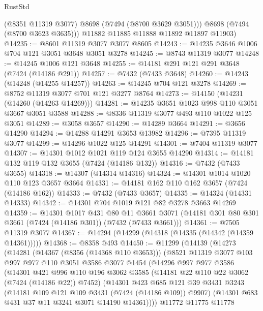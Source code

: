 \begin{lexlean}{RustStd}
\begin{coremodule}
          (@8351 @11319 @3077)
          @8698
          (@7494 (@8700 @3629 @3051)))
        @8698
        (@7494 (@8700 @3623 @3635)))
      @11882
      @11885
      @11888
      @11892
      @11897
      @11903)
@14235 := @8601 @11319 @3077 @3077 @8605
@14243 := @14235 @3646 @1006 @704 @121 @3051 @3648 @3051 @3278
@14245 := @8743 @11319 @3077
@14248 := @14245 @1006 @121 @3648
@14255 := @14181 @291 @121 @291 @3648 (@7424 (@14186 @291))
@14257 := @7432 (@7433 @3648)
@14260 := @14243 (@14248 (@14255 @14257))
@14263 := @14245 @704 @121 @3278
@14269 := @8752 @11319 @3077 @701 @121 @3277 @8764
@14273 := @14150 (@14231 (@14260 (@14263 @14269)))
@14281 := @14235 @3651 @1023 @998 @110 @3051 @3667 @3051 @3588
@14288 := @8336 @11319 @3077 @493 @110 @1022 @125 @3051
@14289 := @3058 @3657
@14290 := @14289 @3664
@14291 := @3656 @14290
@14294 := @14288 @14291 @3653 @13982
@14296 := @7395 @11319 @3077
@14299 := @14296 @1022 @125 @14291
@14301 := @7404 @11319 @3077
@14307 := @14301 @1012 @1021 @119 @124 @3655 @14290
@14314 := @14181 @132 @119 @132 @3655 (@7424 (@14186 @132))
@14316 := @7432 (@7433 @3655)
@14318 := @14307 (@14314 @14316)
@14324 := @14301 @1014 @1020 @110 @123 @3657 @3664
@14331 := @14181 @162 @110 @162 @3657 (@7424 (@14186 @162))
@14333 := @7432 (@7433 @3657)
@14335 := @14324 (@14331 @14333)
@14342 := @14301 @704 @1019 @121 @82 @3278 @3663 @14269
@14359 := @14301
    @1017
    @431
    @80
    @11
    @3661
    @3071
    (@14181 @301 @80 @301 @3661 (@7424 (@14186 @301)) (@7432 (@7433 @3661)))
@14361 := @7505 @11319 @3077
@14367 := @14294 (@14299 (@14318 (@14335 (@14342 (@14359 @14361)))))
@14368 := @8358 @493
@14450 := @11299
    (@14139
      (@14273
        (@14281
          (@14367 (@8356 (@14368 @110 @3653)))
          (@8521
            @11319
            @3077
            @103
            @997
            @977
            @110
            @3051
            @3586
            @3077
            @1454
            (@14296
              @997
              @977
              @3586
              (@14301
                @421
                @996
                @110
                @196
                @3062
                @3585
                (@14181 @22 @110 @22 @3062 (@7424 (@14186 @22)) @7452)
                (@14301
                  @423
                  @685
                  @121
                  @39
                  @3431
                  @3243
                  (@14181 @109 @121 @109 @3431 (@7424 (@14186 @109)) @9907)
                  (@14301 @683 @431 @37 @11 @3241 @3071 @14190 @14361))))
            @11772
            @11775
            @11778

\end{coremodule}
\end{lexlean}
